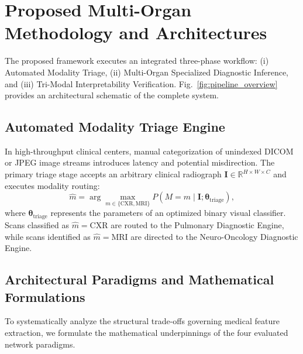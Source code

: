 \documentclass[journal]{IEEEtran}
\begin{document}
\section{Proposed Multi-Organ Methodology and Architectures}
The proposed framework executes an integrated three-phase workflow: (i) Automated Modality Triage, (ii) Multi-Organ Specialized Diagnostic Inference, and (iii) Tri-Modal Interpretability Verification. Fig.~\ref{fig:pipeline_overview} provides an architectural schematic of the complete system.

\subsection{Automated Modality Triage Engine}
In high-throughput clinical centers, manual categorization of unindexed DICOM or JPEG image streams introduces latency and potential misdirection. The primary triage stage accepts an arbitrary clinical radiograph $\mathbf{I} \in \mathbb{R}^{H \times W \times C}$ and executes modality routing:
\begin{equation}
\hat{m} = \arg\max_{m \in \{\text{CXR}, \text{MRI}\}} P(M = m \mid \mathbf{I}; \boldsymbol{\theta}_{\text{triage}}),
\label{eq:triage}
\end{equation}
where $\boldsymbol{\theta}_{\text{triage}}$ represents the parameters of an optimized binary visual classifier. Scans classified as $\hat{m} = \text{CXR}$ are routed to the Pulmonary Diagnostic Engine, while scans identified as $\hat{m} = \text{MRI}$ are directed to the Neuro-Oncology Diagnostic Engine.

\subsection{Architectural Paradigms and Mathematical Formulations}
To systematically analyze the structural trade-offs governing medical feature extraction, we formulate the mathematical underpinnings of the four evaluated network paradigms.
\end{document}
